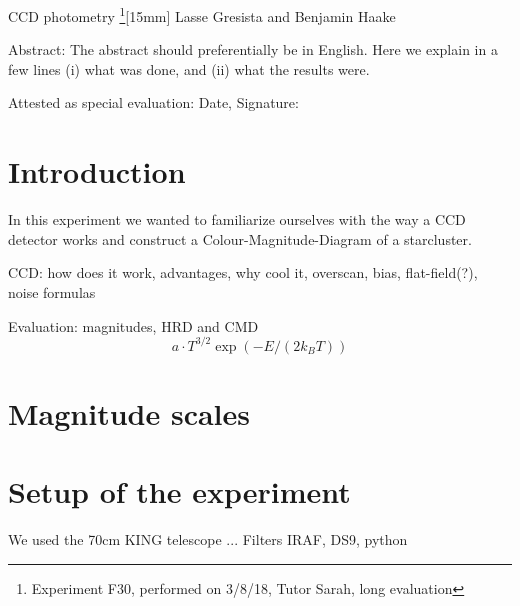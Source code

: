 \documentclass[12pt]{article}
\begin{document}
\thispagestyle{empty}     %
\null
\vspace{40mm}
\begin{center}
{%
\Large  CCD photometry
\footnote{\noindent Experiment F30, performed on 3/8/18, Tutor Sarah, long evaluation}}[15mm]
Lasse Gresista and Benjamin Haake

\vspace{25mm}

\parbox{0.9\textwidth}{   %
Abstract:    
\small The abstract should preferentially be in English. Here we explain in a
few lines (i) what was done, and (ii) what the results were.
}
\end{center}

\vfill
Attested as special evaluation: Date, Signature:
\vspace{20mm}

\newpage  
\null\thispagestyle{empty} 
   

\newpage

\section{Introduction}
	In this experiment we wanted to familiarize ourselves with the way a CCD detector works and construct a Colour-Magnitude-Diagram of a starcluster. %

CCD: how does it work, advantages, why cool it, overscan, bias, flat-field(?), noise formulas

Evaluation: magnitudes, HRD and CMD
\begin{equation}
	a\cdot T^{3/2} \exp(-E/(2k_BT))
	\label{BG}
\end{equation}

\section{Magnitude scales}


\section{Setup of the experiment}
	We used the 70cm KING telescope ...
	Filters
	IRAF, DS9, python
\end{document}
